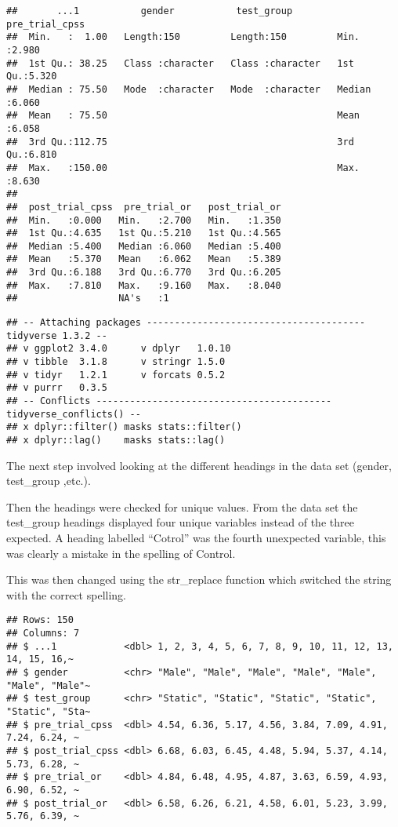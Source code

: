 \documentclass[
]{article}
\begin{document}
\begin{verbatim}
##       ...1           gender           test_group        pre_trial_cpss 
##  Min.   :  1.00   Length:150         Length:150         Min.   :2.980  
##  1st Qu.: 38.25   Class :character   Class :character   1st Qu.:5.320  
##  Median : 75.50   Mode  :character   Mode  :character   Median :6.060  
##  Mean   : 75.50                                         Mean   :6.058  
##  3rd Qu.:112.75                                         3rd Qu.:6.810  
##  Max.   :150.00                                         Max.   :8.630  
##                                                                        
##  post_trial_cpss  pre_trial_or   post_trial_or  
##  Min.   :0.000   Min.   :2.700   Min.   :1.350  
##  1st Qu.:4.635   1st Qu.:5.210   1st Qu.:4.565  
##  Median :5.400   Median :6.060   Median :5.400  
##  Mean   :5.370   Mean   :6.062   Mean   :5.389  
##  3rd Qu.:6.188   3rd Qu.:6.770   3rd Qu.:6.205  
##  Max.   :7.810   Max.   :9.160   Max.   :8.040  
##                  NA's   :1
\end{verbatim}

\begin{verbatim}
## -- Attaching packages --------------------------------------- tidyverse 1.3.2 --
## v ggplot2 3.4.0      v dplyr   1.0.10
## v tibble  3.1.8      v stringr 1.5.0 
## v tidyr   1.2.1      v forcats 0.5.2 
## v purrr   0.3.5      
## -- Conflicts ------------------------------------------ tidyverse_conflicts() --
## x dplyr::filter() masks stats::filter()
## x dplyr::lag()    masks stats::lag()
\end{verbatim}

The next step involved looking at the different headings in the data set
(gender, test\_group ,etc.).

Then the headings were checked for unique values. From the data set the
test\_group headings displayed four unique variables instead of the
three expected. A heading labelled ``Cotrol'' was the fourth unexpected
variable, this was clearly a mistake in the spelling of Control.

This was then changed using the str\_replace function which switched the
string with the correct spelling.

\begin{verbatim}
## Rows: 150
## Columns: 7
## $ ...1            <dbl> 1, 2, 3, 4, 5, 6, 7, 8, 9, 10, 11, 12, 13, 14, 15, 16,~
## $ gender          <chr> "Male", "Male", "Male", "Male", "Male", "Male", "Male"~
## $ test_group      <chr> "Static", "Static", "Static", "Static", "Static", "Sta~
## $ pre_trial_cpss  <dbl> 4.54, 6.36, 5.17, 4.56, 3.84, 7.09, 4.91, 7.24, 6.24, ~
## $ post_trial_cpss <dbl> 6.68, 6.03, 6.45, 4.48, 5.94, 5.37, 4.14, 5.73, 6.28, ~
## $ pre_trial_or    <dbl> 4.84, 6.48, 4.95, 4.87, 3.63, 6.59, 4.93, 6.90, 6.52, ~
## $ post_trial_or   <dbl> 6.58, 6.26, 6.21, 4.58, 6.01, 5.23, 3.99, 5.76, 6.39, ~
\end{verbatim}
\end{document}

